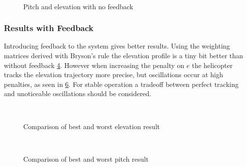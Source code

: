 \begin{figure}[h]
    \centering
    \begin{subfigure}[t]{0.5\textwidth}
        \centering
        
        \label{fig:4_elevation_no_fb}
    \end{subfigure}%
    ~
    \begin{subfigure}[t]{0.5\textwidth}
        \centering
        
        \label{fig:4_pitch_no_fb}
    \end{subfigure}\vspace{-0.4cm}
    \caption{Pitch and elevation with no feedback}
\end{figure}

\subsubsection{Results with Feedback}
Introducing feedback to the system gives better results. Using the weighting matrices derived with Bryson's rule the elevation profile is a tiny bit better than without feedback \cref{fig:4_worst_elevation}. However when increasing the penalty on $e$ the helicopter tracks the elevation trajectory more precise, but oscillations occur at high penalties, as seen in \cref{fig:4_best_elevation}. For stable operation a tradeoff between perfect tracking and unoticeable oscillations should be considered.

\begin{figure}[h!]
    \centering
    \begin{subfigure}[t]{0.5\textwidth}
        \centering
        
        \label{fig:4_worst_elevation}
    \end{subfigure}%
    ~
    \begin{subfigure}[t]{0.5\textwidth}
        \centering
        
        \label{fig:4_best_elevation}
    \end{subfigure}\vspace{-0.6cm}
    \caption{Comparison of best and worst elevation result}
\end{figure}
\begin{figure}[h]
    \centering
    \begin{subfigure}[t]{0.5\textwidth}
        \centering
        
        \label{fig:4_worst_pitch}
    \end{subfigure}%
    ~
    \begin{subfigure}[t]{0.5\textwidth}
        \centering
        
        \label{fig:4_best_pitch}
    \end{subfigure}\vspace{-0.4cm}
    \caption{Comparison of best and worst pitch result}
\end{figure}

